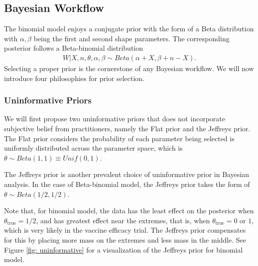 \documentclass[12pt]{amsart}
\begin{document}
\subsection{Bayesian Workflow}

The binomial model enjoys a conjugate prior with the form of a Beta distribution with $\alpha, \beta$ being the first and second shape parameters. The corresponding posterior follows a Beta-binomial distribution
\begin{align}
    W|X, n, \theta, \alpha, \beta \sim Beta (\alpha + X, \beta + n - X).
\end{align}
Selecting a proper prior is the cornerstone of any Bayesian workflow. We will now introduce four philosophies for prior selection. 
\subsubsection{Uninformative Priors}
We will first propose two uninformative priors that does not incorporate subjective belief from practitioners, namely the Flat prior and the Jeffreys prior. The Flat prior considers the probability of each parameter being selected is uniformly distributed across the parameter space, which is 
$   \theta \sim Beta(1, 1) \equiv Unif(0, 1).
    \label{pri: flat}$
    
The Jeffreys prior is another prevalent choice of uninformative prior in Bayesian analysis. In the case of Beta-binomial model, the Jeffreys prior takes the form of
$    \theta \sim Beta(1/2, 1/2).
    \label{pri: Jef}$
    
Note that, for binomial model, the data has the least effect on the posterior when $\theta_{\text{true}} = 1/2$, and has greatest effect near the extremes, that is, when $\theta_{\text{true}} = 0 \text{ or } 1$, which is very likely in the vaccine efficacy trial. The Jeffreys prior compensates for this by placing more mass on the extremes and less mass in the middle. See Figure \ref{fig: uninformative} for a visualization of the Jeffreys prior for binomial model.
\end{document}
